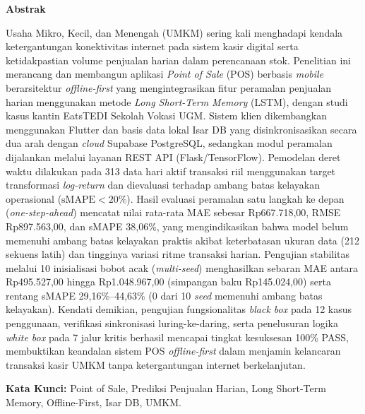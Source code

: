 \documentclass[10pt,a4paper]{article}
\begin{document}
\vspace{1pt}
\noindent{\color{dividerblue}\rule{\textwidth}{1.5pt}}
\vspace{1pt}

{\fontsize{13pt}{15pt}\bfseries Abstrak\par}
\vspace{3pt}

{\fontsize{9.5pt}{12pt}\selectfont
Usaha Mikro, Kecil, dan Menengah (UMKM) sering kali menghadapi kendala ketergantungan konektivitas internet pada sistem kasir digital serta ketidakpastian volume penjualan harian dalam perencanaan stok. Penelitian ini merancang dan membangun aplikasi \textit{Point of Sale} (POS) berbasis \textit{mobile} berarsitektur \textit{offline-first} yang mengintegrasikan fitur peramalan penjualan harian menggunakan metode \textit{Long Short-Term Memory} (LSTM), dengan studi kasus kantin EatsTEDI Sekolah Vokasi UGM. Sistem klien dikembangkan menggunakan Flutter dan basis data lokal Isar DB yang disinkronisasikan secara dua arah dengan \textit{cloud} Supabase PostgreSQL, sedangkan modul peramalan dijalankan melalui layanan REST API (Flask/TensorFlow). Pemodelan deret waktu dilakukan pada 313 data hari aktif transaksi riil menggunakan target transformasi \textit{log-return} dan dievaluasi terhadap ambang batas kelayakan operasional ($\text{sMAPE} < 20\%$). Hasil evaluasi peramalan satu langkah ke depan (\textit{one-step-ahead}) mencatat nilai rata-rata MAE sebesar Rp667.718,00, RMSE Rp897.563,00, dan sMAPE 38,06\%, yang mengindikasikan bahwa model belum memenuhi ambang batas kelayakan praktis akibat keterbatasan ukuran data (212 sekuens latih) dan tingginya variasi ritme transaksi harian. Pengujian stabilitas melalui 10 inisialisasi bobot acak (\textit{multi-seed}) menghasilkan sebaran MAE antara Rp495.527,00 hingga Rp1.048.967,00 (simpangan baku Rp145.024,00) serta rentang sMAPE 29,16\%--44,63\% (0 dari 10 \textit{seed} memenuhi ambang batas kelayakan). Kendati demikian, pengujian fungsionalitas \textit{black box} pada 12 kasus penggunaan, verifikasi sinkronisasi luring-ke-daring, serta penelusuran logika \textit{white box} pada 7 jalur kritis berhasil mencapai tingkat kesuksesan 100\% PASS, membuktikan keandalan sistem POS \textit{offline-first} dalam menjamin kelancaran transaksi kasir UMKM tanpa ketergantungan internet berkelanjutan.\par}

\vspace{4pt}
{\fontsize{9.5pt}{12pt}\selectfont\textbf{Kata Kunci:} Point of Sale, Prediksi Penjualan Harian, Long Short-Term Memory, Offline-First, Isar DB, UMKM.\par}
\vspace{6pt}
\noindent{\color{dividerblue}\rule{\textwidth}{0.8pt}}
\vspace{8pt}
\end{document}
